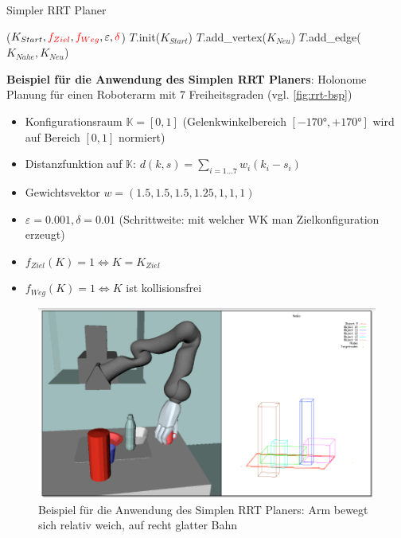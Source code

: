 \begin{algorithm}[h!]
  \caption{Simpler RRT Planer
    \label{alg:rrt-erw}}
  \begin{algorithmic}[1]
    ($K_{Start}, \textcolor{red}{f_{Ziel}}, \textcolor{red}{f_{Weg}}, \varepsilon, \textcolor{red}{\delta}$)
      \State $T$.init($K_{Start}$) 
         
         
        	\State $T$.add\_vertex($K_{Neu}$)
        	\State $T$.add\_edge($K_{Nahe}, K_{Neu}$)
        	 
        		\State {}
        	\EndIf
        \EndIf
      \EndFor
      \State {}
  \end{algorithmic}
\end{algorithm}
\newpage \noindent
\textbf{Beispiel für die Anwendung des Simplen RRT Planers}: Holonome Planung für einen Roboterarm mit 7 Freiheitsgraden (vgl. \autoref{fig:rrt-bsp})
\begin{itemize}
\item Konfigurationsraum $\mathbb{K}= \left[0,1\right]$ (Gelenkwinkelbereich $\left[-170°, +170°\right]$ wird auf Bereich $\left[0,1\right]$ normiert)
\item Distanzfunktion auf $\mathbb{K}$: $d(k,s) = \sum\limits_{i = 1...7} w_i (k_i - s_i)$
\item Gewichtsvektor $w=(1.5,1.5,1.5,1.25,1,1,1)$
\item $\varepsilon = 0.001, \delta = 0.01$ (Schrittweite: mit welcher WK man Zielkonfiguration erzeugt)
\item $f_{Ziel}(K) = 1 \Leftrightarrow K = K_ {Ziel}$
\item $f_{Weg}(K) = 1 \Leftrightarrow K$ ist kollisionsfrei
\end{itemize}
\begin{figure}[h!]
	\centering
	\includegraphics[width=.5\textwidth]{figures/ch04_rrt-bsp.png}
	\caption{Beispiel für die Anwendung des Simplen RRT Planers: Arm bewegt sich relativ weich, auf recht glatter Bahn}
	\label{fig:rrt-bsp}
\end{figure}
